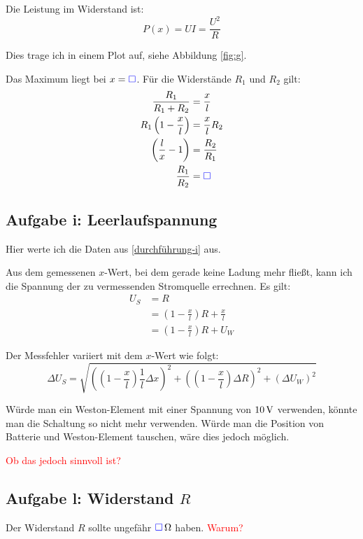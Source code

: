 \documentclass[11pt, ngerman]{article}
\newcommand{\messwert}{\textcolor{blue}{\square}}
\begin{document}
Die Leistung im Widerstand ist:
\[ P(x) = U I = \frac{U^2}R \]

Dies trage ich in einem Plot auf, siehe Abbildung \ref{fig:g}.

Das Maximum liegt bei $x = \messwert$. Für die Widerstände $R_1$ und $R_2$ gilt:
\begin{align*}
	\frac{R_1}{R_1 + R_2} &= \frac{x}{l} \\
	R_1 \left( 1 - \frac{x}{l} \right) &= \frac{x}{l} R_2 \\
		   \left( \frac{l}{x} - 1 \right) &= \frac{R_2}{R_1} \\
					\frac{R_1}{R_2} &= \messwert
\end{align*}

\subsection{Aufgabe i: Leerlaufspannung}

\label{auswertung-i}

Hier werte ich die Daten aus \ref{durchführung-i} aus.

Aus dem gemessenen $x$-Wert, bei dem gerade keine Ladung mehr fließt, kann ich die Spannung der zu vermessenden Stromquelle errechnen. Es gilt:
\begin{align*}
	U_S &= R \\
	&= \left( 1 - \frac xl \right) R + \frac xl \\
	&= \left( 1 - \frac xl \right) R + U_W
\end{align*}

Der Messfehler variiert mit dem $x$-Wert wie folgt:
\[
	\Delta U_S = \sqrt{
		\left( \left( 1 - \frac xl \right) \frac 1l \Delta x \right)^2
		+ \left( \left( 1 - \frac xl \right) \Delta R \right)^2
		+ \left( \Delta U_W \right)^2
	}
\]

Würde man ein Weston-Element mit einer Spannung von $\unit[10] V$ verwenden,
könnte man die Schaltung so nicht mehr verwenden. Würde man die Position von
Batterie und Weston-Element tauschen, wäre dies jedoch möglich.

\textcolor{red}{Ob das jedoch sinnvoll ist?}

\subsection{Aufgabe l: Widerstand $R$}

\label{auswertung-l}

Der Widerstand $R$ sollte ungefähr $\unit[\messwert] \Omega$ haben. \textcolor{red}{Warum?}
\end{document}
